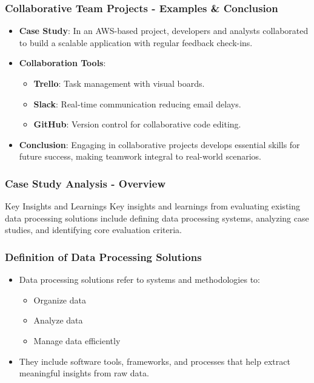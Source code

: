\documentclass[aspectratio=169]{beamer}
\begin{document}
\begin{frame}[fragile]
    \frametitle{Collaborative Team Projects - Examples & Conclusion}
    \begin{itemize}
        \item \textbf{Case Study}:
        In an AWS-based project, developers and analysts collaborated to build a scalable application with regular feedback check-ins.

        \item \textbf{Collaboration Tools}:
        \begin{itemize}
            \item \textbf{Trello}: Task management with visual boards.
            \item \textbf{Slack}: Real-time communication reducing email delays.
            \item \textbf{GitHub}: Version control for collaborative code editing.
        \end{itemize}

        \item \textbf{Conclusion}:
        Engaging in collaborative projects develops essential skills for future success, making teamwork integral to real-world scenarios.
    \end{itemize}
\end{frame}

\begin{frame}[fragile]
    \frametitle{Case Study Analysis - Overview}
    \begin{block}{Key Insights and Learnings}
        Key insights and learnings from evaluating existing data processing solutions include defining data processing systems, analyzing case studies, and identifying core evaluation criteria.
    \end{block}
\end{frame}

\begin{frame}[fragile]
    \frametitle{Definition of Data Processing Solutions}
    \begin{itemize}
        \item Data processing solutions refer to systems and methodologies to:
        \begin{itemize}
            \item Organize data
            \item Analyze data
            \item Manage data efficiently
        \end{itemize}
        \item They include software tools, frameworks, and processes that help extract meaningful insights from raw data.
    \end{itemize}
\end{frame}
\end{document}
